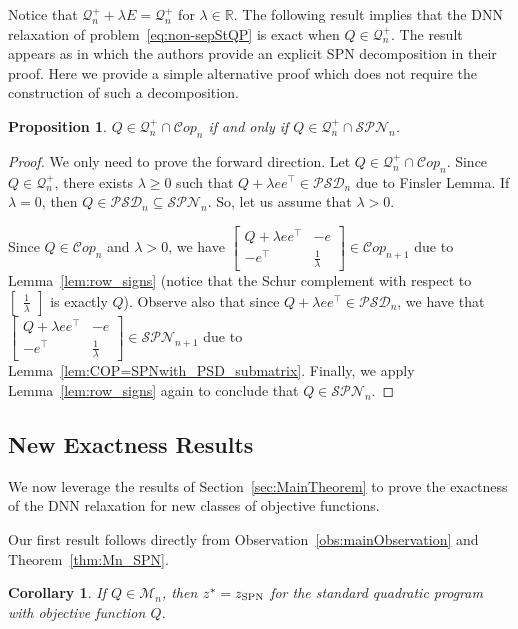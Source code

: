 \documentclass{amsart}
\newcommand{\cM}{\mathcal{M}}
\newcommand{\cQ}{\mathcal{Q}}
\newcommand{\Cop}{\mathcal{C}op}
\newcommand{\SPN}{\mathcal{SPN}}
\newcommand{\PSD}{\mathcal{PSD}}
\newtheorem{corollary}[theorem]{Corollary}
\newtheorem{proposition}[theorem]{Proposition}
\theoremstyle{definition}
\begin{document}
Notice that $\cQ_n^{+} + \lambda E =  \cQ_n^{+}$ for $\lambda\in\mathbb{R}$. The following result implies that the DNN relaxation of problem~\eqref{eq:non-sepStQP} is exact when $Q\in\cQ_n^+$. The result appears as \cite[Proposition 4]{gokmen2022standard} in which the authors provide an explicit SPN decomposition in their proof. Here we provide a simple alternative proof which does not require the construction of such a decomposition. 
\begin{proposition}
 $Q \in \cQ_n^+\cap\Cop_n $ if and only if $Q \in \cQ_n^+ \cap \mathcal{SPN}_n$.
\end{proposition}

\begin{proof}
    We only need to prove the forward direction. Let $Q \in  \cQ_n^+\cap\Cop_n$. Since $Q\in \cQ_n^+$, there exists $\lambda\ge0$ such that $Q+\lambda ee^\top  \in \PSD_n$ due to Finsler Lemma. If $\lambda=0$, then $Q\in \PSD_n \subseteq \SPN_n$. So, let us assume that $\lambda > 0$.

    Since $Q \in \Cop_n$ and $\lambda >0$, we have $\begin{bmatrix}
        Q+\lambda ee^\top  & - e \\ -e^\top  & \frac{1}{\lambda}
    \end{bmatrix} \in \Cop_{n+1}$ due to Lemma~\ref{lem:row_signs} (notice that the Schur complement with respect to $\begin{bmatrix}\frac{1}{\lambda}\end{bmatrix}$ is exactly $Q$). Observe also that since $ Q+\lambda ee^\top  \in \PSD_n $, we have that $\begin{bmatrix}
        Q+\lambda ee^\top  & - e \\ -e^\top  & \frac{1}{\lambda}
    \end{bmatrix} \in \SPN_{n+1}$ due to Lemma~\ref{lem:COP=SPNwith_PSD_submatrix}. Finally, we apply Lemma~\ref{lem:row_signs} again to conclude that  $Q \in \SPN_n$. 
\end{proof}

\subsection{New Exactness Results}\label{sec:NewResults}
We now leverage the results of Section~\ref{sec:MainTheorem} to prove the exactness of the DNN relaxation for new classes of objective functions. 

Our first result follows directly from Observation~\ref{obs:mainObservation} and Theorem~\ref{thm:Mn_SPN}.
\begin{corollary}\label{cor:Mn_DNN_tight}
If $Q \in \cM_n$, then $z^* = z_{\textup{SPN}}$ for the standard quadratic program with objective function $Q$. 
\end{corollary}
\end{document}
